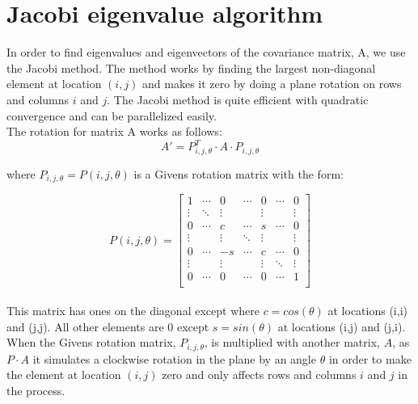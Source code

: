\documentclass[12pt,twoside]{article}
\begin{document}
\section{Jacobi eigenvalue algorithm}

In order to find eigenvalues and eigenvectors of the covariance matrix, A, we use the Jacobi method. The method works by finding the largest non-diagonal element at location $(i,j)$ and makes it zero by doing a plane rotation on rows and columns $i$ and $j$. The Jacobi method is quite efficient with quadratic convergence and can be parallelized easily.  \\


The rotation for matrix A works as follows:
\begin{equation}
     A' = P_{i,j,\theta}^T \cdot A \cdot P_{i,j,\theta}  
\end{equation}

where $P_{i,j,\theta} = P(i,j,\theta)$ is a Givens rotation matrix with the form:

\begin{equation}
P(i,j,\theta) = 
\begin{bmatrix}
     1 & \cdots & 0 & \cdots & 0 & \cdots & 0 \\
     \vdots & \ddots & \vdots &   & \vdots &  & \vdots \\
          0 & \cdots & c & \cdots & s & \cdots & 0 \\
         \vdots &  & \vdots & \ddots  & \vdots &  & \vdots \\
     0 & \cdots & -s & \cdots & c & \cdots & 0 \\
              \vdots &  & \vdots &  & \vdots & \ddots  & \vdots \\
                   0 & \cdots & 0 & \cdots & 0 & \cdots & 1 \\
\end{bmatrix}
\end{equation}\\

This matrix has ones on the diagonal except where $c=cos(\theta)$ at locations (i,i) and (j,j). All other elements are 0 except $s=sin(\theta)$ at locations (i,j) and (j,i).\\

When the Givens rotation matrix, $P_{i,j,\theta}$,  is multiplied with another matrix, $A$, as $P\cdot A$ it simulates a clockwise rotation in the plane by an angle $\theta$ in order to make the element at location $(i,j)$ zero and only affects rows and columns $i$ and $j$ in the process.\\
 
\end{document}
